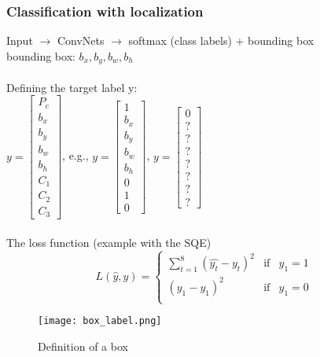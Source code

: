 \subsubsection{Classification with localization}
Input $\rightarrow$ ConvNets $\rightarrow$ softmax (class labels) + bounding box\\
bounding box: $b_x, b_y, b_w, b_h$\\
\\
Defining the target label y:\\
$y = \begin{bmatrix} P_c \\ b_x\\ b_y\\ b_w\\ b_h \\ C_1 \\ C_2 \\ C_3
\end{bmatrix}$, e.g., $y = \begin{bmatrix} 1 \\ b_x\\ b_y\\ b_w\\ b_h \\ 0 \\ 1 \\0
\end{bmatrix}$, $y = \begin{bmatrix} 0 \\ ? \\ ?\\ ?\\ ? \\ ? \\ ? \\?
\end{bmatrix}$\\
\\
The loss function (example with the SQE)
\begin{equation}
L(\hat{y}, y) = \left\{ 
    \begin{array}{rll}
   \sum_{t=1}^8(\hat{y_t} - y_t)^2 & \text{if} & y_1 =1 \\
    (\hat{y_1} - y_1)^2 & \text{if} &y_1 = 0 \\
    \end{array} \right.
\end{equation}

\begin{figure}[h]
    \centering
    \texttt{[image: box\_label.png]}
    \caption{Definition of a box}
    \label{fig:boxlabel}
\end{figure}

